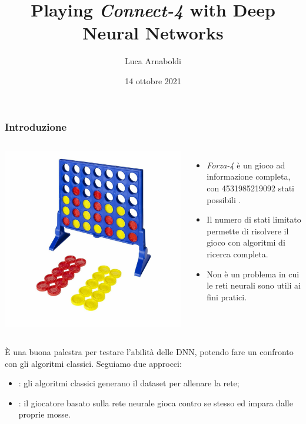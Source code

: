\documentclass{beamer}
\title[Playing \emph{Connect-4} with DNN]{Playing \emph{Connect-4} with Deep Neural Networks}
\subtitle{}
\author[Luca Arnaboldi]{Luca Arnaboldi}
\institute[]{Corso ``Computing Methods for Experimental Physics and Data Analysis''}
\date[14-10-2021]{14 ottobre 2021}
\begin{document}
  
  \begin{frame}
    \frametitle{Introduzione}
    \begin{columns}
        \includegraphics[width=\textwidth]{img/connect4tablegame.jpg}
      
        \begin{itemize}
          \item \emph{Forza-4} è un gioco ad informazione completa, con \num{4531985219092} stati possibili \cite{oeis}. 
          \item Il numero di stati limitato permette di risolvere il gioco con algoritmi di ricerca completa.
          \item Non è un problema in cui le reti neurali sono utili ai fini pratici.
        \end{itemize}      
    \end{columns}
    \pause
    È una buona palestra per testare l'abilità delle DNN, potendo fare un confronto con gli algoritmi classici. Seguiamo due approcci:
    \begin{itemize}
      \item {}: gli algoritmi classici generano il dataset per allenare la rete;
      \item {}: il giocatore basato sulla rete neurale gioca contro se stesso ed impara dalle proprie mosse. 
    \end{itemize}
  \end{frame}
\end{document}
